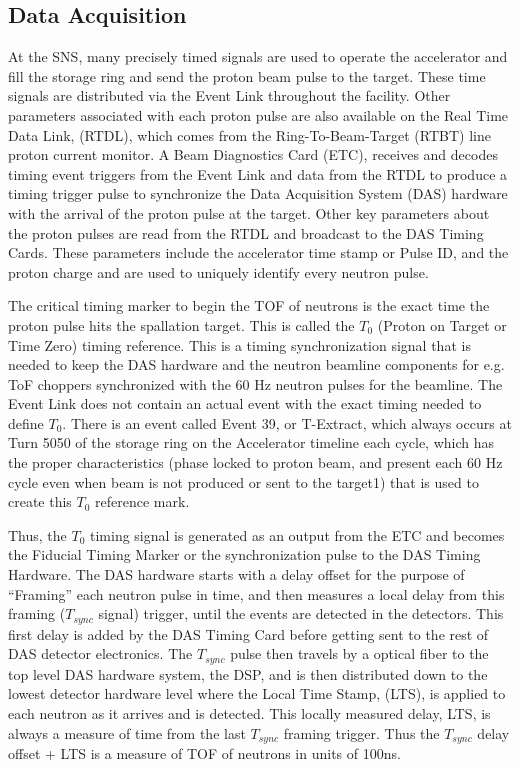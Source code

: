 \subsection{Data Acquisition}

At the SNS, many precisely timed signals are used to operate the accelerator and fill the storage ring and send the proton beam pulse to the target. These time signals are distributed via the Event Link throughout the facility. Other parameters associated with each proton pulse are also available on the Real Time Data Link, (RTDL), which comes from the Ring-To-Beam-Target (RTBT) line proton current monitor. A Beam Diagnostics Card (ETC), receives and decodes timing event triggers from the Event Link and data from the RTDL to produce a timing trigger pulse to synchronize the Data Acquisition System (DAS) hardware with the arrival of the proton pulse at the target. Other key parameters about the proton pulses are read from the RTDL and broadcast to the DAS Timing Cards. These parameters include the accelerator time stamp or Pulse ID, and the proton charge and are used to uniquely identify every neutron pulse.

The critical timing marker to begin the TOF of neutrons is the exact time the proton pulse hits the spallation target. This is called the $T_0$ (Proton on Target or Time Zero) timing reference. This is a timing synchronization signal that is needed to keep the DAS hardware and the neutron beamline components for e.g. ToF choppers synchronized with the 60 Hz neutron pulses for the beamline. The Event Link does not contain an actual event with the exact timing needed to define $T_0$. There is an event called Event 39, or T-Extract, which always occurs at Turn 5050 of the storage ring on the Accelerator timeline each cycle, which has the proper characteristics (phase locked to proton beam, and present each 60 Hz cycle even when beam is not produced or sent to the target1) that is used to create this $T_0$ reference mark. 

Thus, the $T_0$ timing signal is generated as an output from the ETC and becomes the Fiducial Timing Marker or the synchronization pulse to the DAS Timing Hardware. The DAS hardware starts with a delay offset for the purpose of “Framing” each neutron pulse in time, and then measures a local delay from this framing ($T_{sync}$ signal) trigger, until the events are detected in the detectors. This first delay is added by the DAS Timing Card before getting sent to the rest of DAS detector electronics. The $T_{sync}$ pulse then travels by a optical fiber to the top level DAS hardware system, the DSP, and is then distributed down to the lowest detector hardware level where the Local Time Stamp, (LTS), is applied to each neutron as it arrives and is detected. This locally measured delay, LTS, is always a measure of time from the last $T_{sync}$ framing trigger. Thus the $T_{sync}$ delay offset + LTS is a measure of TOF of neutrons in units of 100ns.

